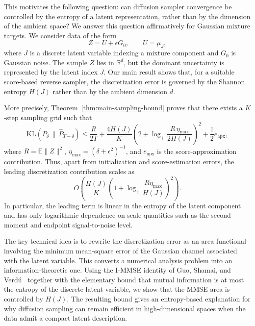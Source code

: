 \documentclass[11pt]{article}
\newcommand{\KL}{\mathrm{KL}}
\begin{document}
This motivates the following question: can diffusion sampler convergence be
controlled by the entropy of a latent representation, rather than by the
dimension of the ambient space? We answer this question affirmatively for
Gaussian mixture targets. We consider data of the form
\[
    Z = U + \epsilon G_0,
    \qquad
    U = \mu_J,
\]
where $J$ is a discrete latent variable indexing a mixture component and
$G_0$ is Gaussian noise. The sample $Z$ lies in $\mathbb R^d$, but the
dominant uncertainty is represented by the latent index $J$. Our main result
shows that, for a suitable score-based reverse sampler, the discretization
error is governed by the Shannon entropy $H(J)$ rather than by the ambient
dimension $d$.

More precisely, Theorem~\ref{thm:main-sampling-bound} proves that there
exists a $K$-step sampling grid such that
\[
    \KL(P_\delta\,\|\,\widehat P_{T-\delta})
    \le
    \frac{R}{2T}
    +
    \frac{4H(J)}{K}
    \left(
    2+\log_+\frac{R\,\eta_{\max}}{2H(J)}
    \right)^2
    +
    \frac12 e_{\mathrm{apx}} ,
\]
where $R=\mathbb E\|Z\|^2$, $\eta_{\max}=(\delta+\epsilon^2)^{-1}$, and
$e_{\mathrm{apx}}$ is the score-approximation contribution. Thus, apart from
initialization and score-estimation errors, the leading discretization
contribution scales as
\[
    O\!\left(
    \frac{H(J)}{K}
    \left(
    1+\log_+\frac{R\eta_{\max}}{H(J)}
    \right)^2
    \right).
\]
In particular, the leading term is linear in the entropy of the latent
component and has only logarithmic dependence on scale quantities such as the
second moment and endpoint signal-to-noise level.

The key technical idea is to rewrite the discretization error as an area
functional involving the minimum mean-square error of the Gaussian channel
associated with the latent variable. This converts a numerical analysis
problem into an information-theoretic one. 
Using the I-MMSE identity of Guo, Shamai, and Verd{\'u}~\cite{guo2005mutual} together
with the elementary bound that mutual information is at most the entropy of
the discrete latent variable, we show that the MMSE area is controlled by
$H(J)$. The resulting bound gives an entropy-based explanation for why
diffusion sampling can remain efficient in high-dimensional spaces when the
data admit a compact latent description.
\end{document}

